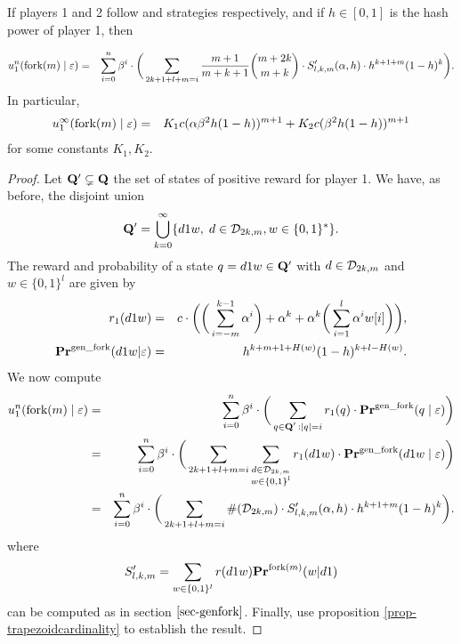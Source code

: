 \begin{myprop*}
If players 1 and 2 follow \mfork and \df strategies respectively, and if $h\in [0,1]$ is the hash power of player 1, then

\begin{eqnarray*}
	u_1^n(\text{\rm fork($m$)} \mid \varepsilon) & = & \sum_{i=0}^{n}\beta^{i} \cdot  \bigg(\sum_{2k+1+l+m=i} \frac{m+1}{m+k+1}{m+2k\choose m+k} \cdot S'_{l,k,m}(\alpha,h)\cdot h^{k+1+m}(1-h)^{k}\bigg).
\end{eqnarray*}
In particular,
\begin{eqnarray*}
	u_1^\infty(\text{\rm fork($m$)} \mid \varepsilon) & = & K_1 c(\alpha\beta^2h(1-h))^{m+1}+K_2 c(\beta^2h(1-h))^{m+1}
\end{eqnarray*}
for some constants $K_1,K_2$.

\end{myprop*}
\begin{proof}
	Let $\mathbf{Q}'\subsetneq \mathbf{Q}$ the set of states of positive reward for player 1. We have, as before, the disjoint union
	$$\mathbf{Q}' = \bigcup_{k=0}^\infty \{d1w,\; d\in\mathcal{D}_{2k,m}, w\in\{0,1\}^\ast\}.$$
	The reward and probability of a state $q=d1w\in \mathbf{Q}'$ with $d\in\mathcal{D}_{2k,m}$ and $w\in\{0,1\}^l$ are given by
\begin{eqnarray*}
	r_1(d1w) &=& c\cdot \bigg(\bigg(\sum_{i=-m}^{k-1}\alpha^i \bigg)+\alpha^{k}+\alpha^{k}\bigg(\sum_{i=1}^{l}\alpha^i w[i]\bigg)\bigg),\\
	\mathbf{Pr}^{\text{\rm gen\_fork}}(d1w|\varepsilon) &=& h^{k+m+1+H(w)}(1-h)^{k+l-H(w)}.
\end{eqnarray*} 
We now compute
\begin{eqnarray*}
	u_1^n(\text{\rm fork($m$)} \mid \varepsilon) & = & \sum_{i=0}^{n}\beta^{i} \cdot  \bigg(\sum_{\substack{q \in \mathbf{Q}' \,: |q| = i}} r_1(q) \cdot 
	\mathbf{Pr}^{\text{\rm gen\_fork}}(q \mid \varepsilon)\bigg)\\
								   & = & \sum_{i=0}^{n}\beta^{i} \cdot  \bigg(\sum_{2k+1+l+m=i}\sum_{\substack{d\in \mathcal{D}_{2k,m}\\w\in\{0,1\}^l}} r_1(d1w) \cdot 
	\mathbf{Pr}^{\text{\rm gen\_fork}}(d1w \mid \varepsilon)\bigg)\\
								   & = & \sum_{i=0}^{n}\beta^{i} \cdot  \bigg(\sum_{2k+1+l+m=i} \#(\mathcal{D}_{2k,m})\cdot S'_{l,k,m}(\alpha,h)\cdot h^{k+1+m}(1-h)^{k}\bigg).
\end{eqnarray*}
where
$$S'_{l,k,m}=\sum_{w\in\{0,1\}^l}r(d1w)\mathbf{Pr}^{\text{\rm fork($m$)}}(w|d1)$$
can be computed as in section $\ref{sec-genfork}$. Finally, use proposition \ref{prop-trapezoidcardinality} to establish the result.
\end{proof}

